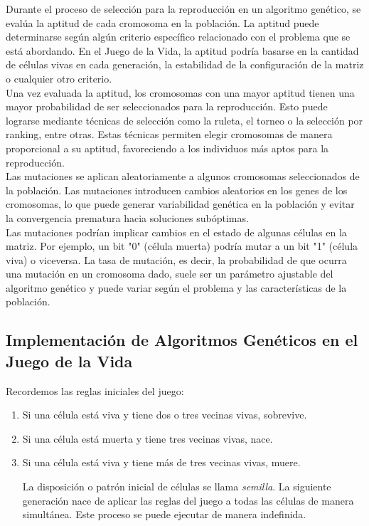 Durante el proceso de selección para la reproducción en un algoritmo genético, se evalúa la aptitud de 
cada cromosoma en la población. La aptitud puede determinarse según algún criterio específico 
relacionado con el problema que se está abordando. En el Juego de la Vida, la aptitud podría basarse 
en la cantidad de células vivas en cada generación, la estabilidad de la configuración de la matriz 
o cualquier otro criterio. \\ 

Una vez evaluada la aptitud, los cromosomas con una mayor aptitud tienen una mayor probabilidad de ser 
seleccionados para la reproducción. Esto puede lograrse mediante técnicas de selección como la ruleta, 
el torneo o la selección por ranking, entre otras. Estas técnicas permiten elegir cromosomas de 
manera proporcional a su aptitud, favoreciendo a los individuos más aptos para la reproducción.\\ 

Las mutaciones se aplican aleatoriamente a algunos cromosomas seleccionados de la población. Las 
mutaciones introducen cambios aleatorios en los genes de los cromosomas, lo que puede generar 
variabilidad genética en la población y evitar la convergencia prematura hacia soluciones subóptimas.\\ 

Las mutaciones podrían implicar cambios en el estado de algunas células en la matriz. Por ejemplo, 
un bit "0" (célula muerta) podría mutar a un bit "1" (célula viva) o viceversa. La tasa de mutación,
 es decir, la probabilidad de que ocurra una mutación en un cromosoma dado, suele ser un parámetro 
 ajustable del algoritmo genético y puede variar según el problema y las características de la población.


\subsection{Implementación de Algoritmos Genéticos en el Juego de la Vida}

Recordemos las reglas iniciales del juego:
\begin{enumerate}
    \item Si una célula está viva y tiene dos o tres vecinas vivas, sobrevive.
    \item Si una célula está muerta y tiene tres vecinas vivas, nace.
    \item Si una célula está viva y tiene más de tres vecinas vivas, muere.
    
    La disposición o patrón inicial de células se llama \textit{semilla}. La siguiente 
    generación nace de aplicar las reglas del juego a todas las células de manera 
    simultánea. Este proceso se puede ejecutar de manera indefinida.
\end{enumerate}

